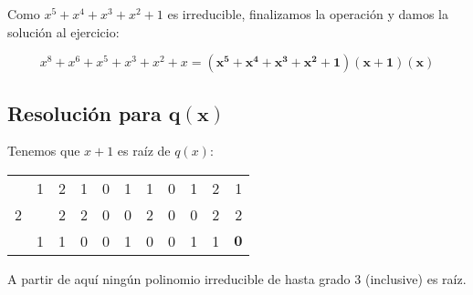 Como $x^5 + x^4 + x^3 + x^2 + 1$ es irreducible, finalizamos la operación y damos la solución al ejercicio:

\[x^8 + x^6 + x^5 + x^3 + x^2 + x = \boldsymbol{(x^5 + x^4 + x^3 + x^2 + 1)(x+1)(x)}\]

\subsection*{Resolución para $\boldsymbol{q(x)}$}

Tenemos que $x + 1$ es raíz de $q(x)$:

\begin{center}
\setlength{\tabcolsep}{1ex}
\begin{tabular}{r | r r r r r r r r r r}
     & 1 & 2 & 1 & 0 & 1 & 1 & 0 & 1 & 2                & 1 \\
	2 &   & 2 & 2 & 0 & 0 & 2 & 0 & 0 & 2                & 2 \\
	\hline
     & 1 & 1 & 0 & 0 & 1 & 0 & 0 & 1 & 1 & $\boldsymbol{0}$
\end{tabular}
\end{center}

A partir de aquí ningún polinomio irreducible de hasta grado 3 (inclusive) es raíz.
